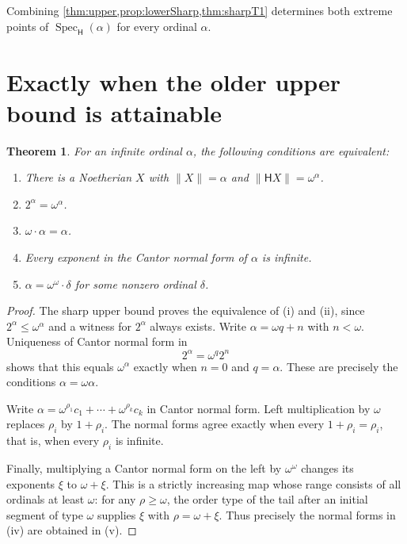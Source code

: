 \documentclass[11pt,a4paper]{article}
\newtheorem{theorem}{Theorem}[section]
\theoremstyle{definition}
\newcommand{\HH}{\mathsf H}
\newcommand{\st}[1]{\lVert #1\rVert}
\newcommand{\Spec}{\operatorname{Spec}_{\HH}}
\numberwithin{equation}{section}
\begin{document}
Combining \cref{thm:upper,prop:lowerSharp,thm:sharpT1} determines both
extreme points of $\Spec(\alpha)$ for every ordinal $\alpha$.

\section{Exactly when the older upper bound is attainable}
\label{sec:oldattain}

\begin{theorem}\label{thm:oldattain}
For an infinite ordinal $\alpha$, the following conditions are equivalent:
\begin{enumerate}[label=\textup{(\roman*)}]
\item There is a Noetherian $X$ with $\st X=\alpha$ and
      $\st{\HH X}=\omega^\alpha$.
\item $2^\alpha=\omega^\alpha$.
\item $\omega\cdot\alpha=\alpha$.
\item Every exponent in the Cantor normal form of $\alpha$ is infinite.
\item $\alpha=\omega^\omega\cdot\delta$ for some nonzero ordinal $\delta$.
\end{enumerate}
\end{theorem}
\begin{proof}
The sharp upper bound proves the equivalence of (i) and (ii), since
$2^\alpha\leq\omega^\alpha$ and a witness for $2^\alpha$ always exists.
Write $\alpha=\omega q+n$ with $n<\omega$.  Uniqueness of Cantor normal
form in
\[
 2^\alpha=\omega^q2^n
\]
shows that this equals $\omega^\alpha$ exactly when $n=0$ and $q=\alpha$.
These are precisely the conditions $\alpha=\omega\alpha$.

Write $\alpha=\omega^{\rho_1}c_1+\cdots+\omega^{\rho_k}c_k$ in Cantor
normal form.  Left multiplication by $\omega$ replaces $\rho_i$ by
$1+\rho_i$.  The normal forms agree exactly when every
$1+\rho_i=\rho_i$, that is, when every $\rho_i$ is infinite.

Finally, multiplying a Cantor normal form on the left by $\omega^\omega$
changes its exponents $\xi$ to $\omega+\xi$.  This is a strictly
increasing map whose range consists of all ordinals at least $\omega$:
for any $\rho\geq\omega$, the order type of the tail after an initial
segment of type $\omega$ supplies $\xi$ with $\rho=\omega+\xi$.
Thus precisely the normal forms in (iv) are obtained in (v).
\end{proof}
\end{document}
